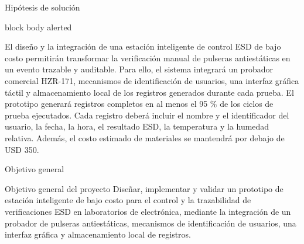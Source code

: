 \documentclass[aspectratio=169]{beamer}
\newcommand{\highlightbox}[1]{
    \begin{beamercolorbox}[
        rounded=true,
        shadow=true,
        wd=\textwidth,
        sep=0.35cm
    ]{block body alerted}
        \justifying
        #1
    \end{beamercolorbox}
}
\begin{document}
\begin{frame}{Hipótesis de solución}

    \vspace{0.35cm}

    \highlightbox{
        \centering
        \large
        El diseño y la integración de una estación inteligente de control ESD de bajo costo 
        permitirán transformar la verificación manual de pulseras antiestáticas en un evento trazable
        y auditable. Para ello, el sistema integrará un probador comercial HZR-171, mecanismos
        de identificación de usuarios, una interfaz gráfica táctil y almacenamiento local de los
        registros generados durante cada prueba.
        El prototipo generará registros completos en al menos el 95 $\%$ de los ciclos de prueba
        ejecutados. Cada registro deberá incluir el nombre y el identificador del usuario, la fecha,
        la hora, el resultado ESD, la temperatura y la humedad relativa. Además, el costo estimado
        de materiales se mantendrá por debajo de USD 350.
    }

\end{frame}

\begin{frame}{Objetivo general}

    \vspace{0.6cm}

    \begin{block}{Objetivo general del proyecto}
        \large
        \justifying
        Diseñar, implementar y validar un prototipo de estación inteligente de bajo
        costo para el control y la trazabilidad de verificaciones ESD en laboratorios de
        electrónica, mediante la integración de un probador de pulseras antiestáticas,
        mecanismos de identificación de usuarios, una interfaz gráfica y almacenamiento
        local de registros.
    \end{block}

\end{frame}
\end{document}
